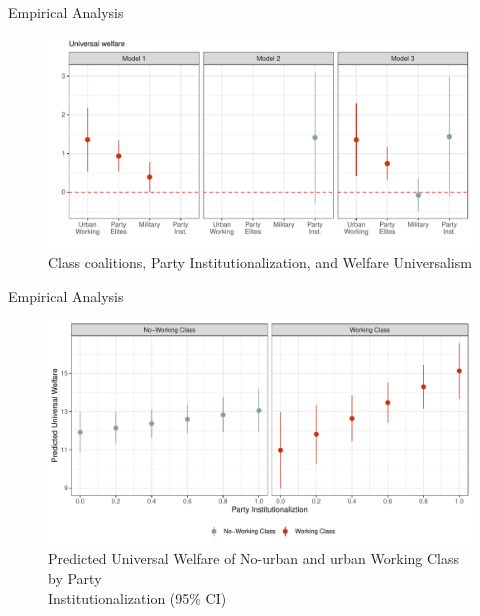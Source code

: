 \documentclass{Bredelebeamer}
\begin{document}
\begin{frame}{Empirical Analysis}
\begin{figure}[!htbt]
	\centering
	\includegraphics[width=1\linewidth]{"PRplot1"}
	\caption{Class coalitions, Party Institutionalization, and Welfare Universalism}
	\label{fig:plot4}
\end{figure}
\end{frame}


\begin{frame}{Empirical Analysis}
\begin{figure}[!htbt]
	\centering
	\includegraphics[width=1\linewidth]{"../3. Datasets_Codebooks/Figures/Plot5"}
	\caption{Predicted Universal Welfare of No-urban and urban Working Class by Party\\Institutionalization (95\% CI)}
	\label{fig:plot6}
\end{figure}
\end{frame}
		
\end{document}
